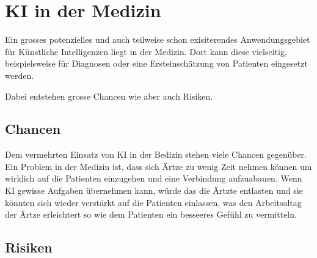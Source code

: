\chapter{KI in der Medizin}
\label{chap:ai-medicine}

Ein grosses potenzielles und auch teilweise schon exisiterendes Anwendungsgebiet für Künstliche Intelligenzen liegt in der Medizin.
Dort kann diese vielseitig, beispielsweise für Diagnosen oder eine Ersteinschätzung von Patienten eingesetzt werden.

Dabei entstehen grosse Chancen wie aber auch Risiken.

\section{Chancen}
Dem vermehrten Einsatz von KI in der Bedizin stehen viele Chancen gegenüber.
Ein Problem in der Medizin ist, dass sich Ärtze zu wenig Zeit nehmen können um wirklich auf die Patienten einzugehen und eine Verbindung aufzuabauen.
Wenn KI gewisse Aufgaben übernehmen kann, würde das die Ärtzte entlasten und sie könnten sich wieder verstärkt auf die Patienten einlassen, was den Arbeitsaltag der Ärtze erleichtert so wie dem Patienten ein besseeres Gefühl zu vermitteln.


\section{Risiken}